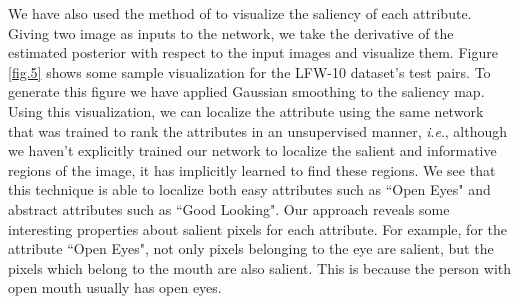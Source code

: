 \documentclass[runningheads]{llncs}
\newcommand{\ie}{\textit{i}.\textit{e}.}
\begin{document}
We have also used the method of \cite{saliency} to visualize the saliency of each attribute. Giving two image as inputs to the network, we take the derivative of the estimated posterior with respect to the input images and visualize them. Figure \ref{fig.5} shows some sample visualization for the LFW-10 dataset's test pairs. To generate this figure we have applied Gaussian smoothing to the saliency map.
Using this visualization, we can localize the attribute using the same network that was trained to rank the attributes in an unsupervised manner, \ie, although we haven't explicitly trained our network to localize the salient and informative regions of the image, it has implicitly learned to find these regions. We see that this technique is able to localize both easy attributes such as ``Open Eyes" and abstract attributes such as ``Good Looking". Our approach reveals some interesting properties about salient pixels for each attribute. For example, for the attribute ``Open Eyes", not only pixels belonging to the eye are salient, but the pixels which belong to the mouth are also salient. This is because the person with open mouth usually has open eyes.
\end{document}
